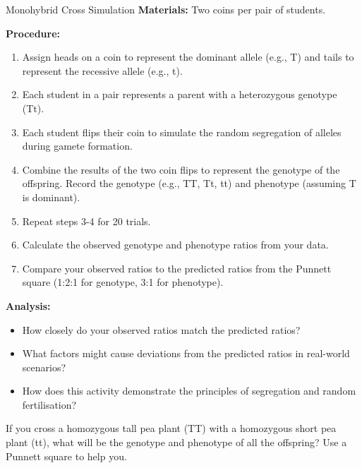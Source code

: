 \begin{investigation}{Monohybrid Cross Simulation}
\textbf{Materials:} Two coins per pair of students.

\textbf{Procedure:}
\begin{enumerate}
    \item  Assign heads on a coin to represent the dominant allele (e.g., T) and tails to represent the recessive allele (e.g., t).
    \item Each student in a pair represents a parent with a heterozygous genotype (Tt).
    \item Each student flips their coin to simulate the random segregation of alleles during gamete formation.
    \item Combine the results of the two coin flips to represent the genotype of the offspring. Record the genotype (e.g., TT, Tt, tt) and phenotype (assuming T is dominant).
    \item Repeat steps 3-4 for 20 trials.
    \item Calculate the observed genotype and phenotype ratios from your data.
    \item Compare your observed ratios to the predicted ratios from the Punnett square (1:2:1 for genotype, 3:1 for phenotype).
\end{enumerate}

\textbf{Analysis:}
\begin{itemize}
    \item How closely do your observed ratios match the predicted ratios?
    \item What factors might cause deviations from the predicted ratios in real-world scenarios?
    \item How does this activity demonstrate the principles of segregation and random fertilisation?
\end{itemize}
\end{investigation}

\begin{stopandthink}
If you cross a homozygous tall pea plant (TT) with a homozygous short pea plant (tt), what will be the genotype and phenotype of all the offspring? Use a Punnett square to help you.
\end{stopandthink}


